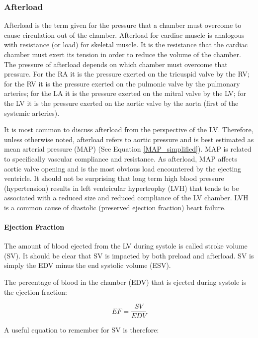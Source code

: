 \subsubsection{Afterload}
Afterload is the term given for the pressure that a chamber must overcome to cause circulation out of the chamber. Afterload for cardiac muscle is analogous with resistance (or load) for skeletal muscle. It is the resistance that the cardiac chamber must exert its tension in order to reduce the volume of the chamber. The pressure of afterload depends on which chamber must overcome that pressure. For the RA it is the pressure exerted on the tricuspid valve by the RV; for the RV it is the pressure exerted on the pulmonic valve by the pulmonary arteries; for the LA it is the pressure exerted on the mitral valve by the LV; for the LV it is the pressure exerted on the aortic valve by the aorta (first of the systemic arteries). 

It is most common to discuss afterload from the perspective of the LV. Therefore, unless otherwise noted, afterload refers to aortic pressure and is best estimated as mean arterial pressure (MAP) (See Equation \ref{MAP_simplified}). MAP is related to specifically vascular compliance and resistance. As afterload, MAP affects aortic valve opening and is the most obvious load encountered by the ejecting ventricle. It should not be surprising that long term high blood pressure (hypertension) results in left ventricular hypertrophy (LVH) that tends to be associated with a reduced size and reduced compliance of the LV chamber. LVH is a common cause of diastolic (preserved ejection fraction) heart failure.

\paragraph{Ejection Fraction}

The amount of blood ejected from the LV during systole is called stroke volume (SV). It should be clear that SV is impacted by both preload and afterload. SV is simply the EDV minus the end systolic volume (ESV). 

The percentage of blood in the chamber (EDV) that is ejected during systole is the ejection fraction: 

\begin{equation}
    EF = \frac{SV}{EDV}
    \label{LVEF}
\end{equation}

A useful equation to remember for SV is therefore:

